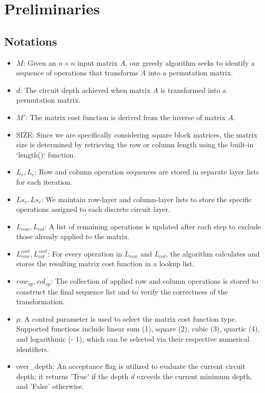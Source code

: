 
\chapter{Preliminaries}

\section{Notations}
\begin{itemize}
    \item $M$: Given an $n \times n$ input matrix $A$, our greedy algorithm seeks to identify a sequence of operations that transforms $A$ into a permutation matrix.
    \item $d$: The circuit depth achieved when matrix $A$ is transformed into a permutation matrix.
    \item $M'$: The matrix cost function is derived from the inverse of matrix $A$.
    \item SIZE: Since we are specifically considering square block matrices, the matrix size is determined by retrieving the row or column length using the built-in `length()` function.
    \item $L_{r}, L_{c}$: Row and column operation sequences are stored in separate layer lists for each iteration.
    \item $Ls_{r}, Ls_{c}$: We maintain row-layer and column-layer lists to store the specific operations assigned to each discrete circuit layer.
    \item $L_{row}, L_{col}$: A list of remaining operations is updated after each step to exclude those already applied to the matrix.
    \item $L_{row}^{cost}, L_{col}^{cost}$: For every operation in $L_{row}$ and $L_{col}$, the algorithm calculates and stores the resulting matrix cost function in a lookup list.
    \item $row_{op}, col_{op}$: The collection of applied row and column operations is stored to construct the final sequence list and to verify the correctness of the transformation.
    \item $p$: A control parameter is used to select the matrix cost function type. Supported functions include linear sum (1), square (2), cubic (3), quartic (4), and logarithmic (- 1), which can be selected via their respective numerical identifiers.
    \item over\_depth: An acceptance flag is utilized to evaluate the current circuit depth; it returns 'True' if the depth $d$ exceeds the current minimum depth, and 'False' otherwise.

\end{itemize}
